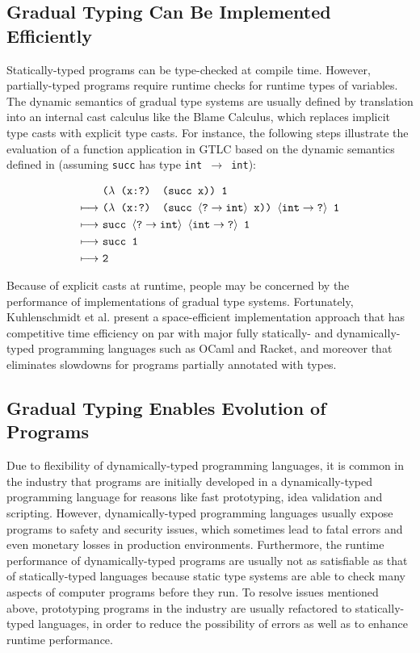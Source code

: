 \subsection{Gradual Typing Can Be Implemented Efficiently}
Statically-typed programs can be type-checked at compile time. However, partially-typed programs require runtime checks for runtime types of variables. The dynamic semantics of gradual type systems are usually defined by translation into an internal cast calculus like the Blame Calculus, which replaces implicit type casts with explicit type casts. For instance, the following steps illustrate the evaluation of a function application in GTLC based on the dynamic semantics defined in \cite{siek2006gradual} (assuming {\tt succ} has type {\tt int $\rightarrow$ int}):

\begin{align*}
& \text{\tt ($\lambda$ (x:?) (succ x)) 1} \\
    \longmapsto \ & \text{\tt ($\lambda$ (x:?) (succ $\langle \text{\tt ?} \rightarrow \text{\tt int} \rangle$ x)) $\langle \text{\tt int} \rightarrow \text{\tt ?} \rangle$ 1} \\
    \longmapsto \ & \text{\tt succ $\langle \text{\tt ?} \rightarrow \text{\tt int} \rangle$ $\langle \text{\tt int} \rightarrow \text{\tt ?} \rangle$ 1} \\
    \longmapsto \ & \text{\tt succ 1} \\
    \longmapsto \ & \text{\tt 2}
\end{align*}

Because of explicit casts at runtime, people may be concerned by the performance of implementations of gradual type systems. Fortunately, Kuhlenschmidt et al. \cite{kuhlenschmidt2018efficient} present a space-efficient implementation approach that has competitive time efficiency on par with major fully statically- and dynamically-typed programming languages such as OCaml and Racket, and moreover that eliminates slowdowns for programs partially annotated with types.

\subsection{Gradual Typing Enables Evolution of Programs}
Due to flexibility of dynamically-typed programming languages, it is common in the industry that programs are initially developed in a dynamically-typed programming language for reasons like fast prototyping, idea validation and scripting. However, dynamically-typed programming languages usually expose programs to safety and security issues, which sometimes lead to fatal errors and even monetary losses in production environments. Furthermore, the runtime performance of dynamically-typed programs are usually not as satisfiable as that of statically-typed languages because static type systems are able to check many aspects of computer programs before they run. To resolve issues mentioned above, prototyping programs in the industry are usually refactored to statically-typed languages, in order to reduce the possibility of errors as well as to enhance runtime performance.

